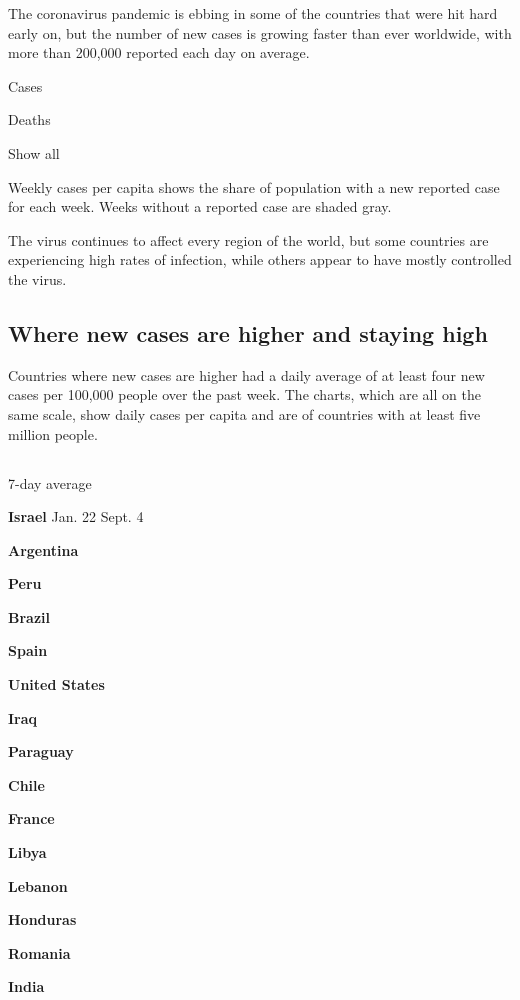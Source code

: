 The coronavirus pandemic is ebbing in some of the countries that were
hit hard early on, but the number of new cases is growing faster than
ever worldwide, with more than 200,000 reported each day on average.

Cases

Deaths

Show all

Weekly cases per capita shows the share of population with a new
reported case for each week. Weeks without a reported case are shaded
gray.

The virus continues to affect every region of the world, but some
countries are experiencing high rates of infection, while others appear
to have mostly controlled the virus.

\hypertarget{where-new-cases-are-higher-and-staying-high}{%
\subsection{Where new cases are higher and staying
high}\label{where-new-cases-are-higher-and-staying-high}}

Countries where new cases are higher had a daily average of at least
four new cases per 100,000 people over the past week. The charts, which
are all on the same scale, show daily cases per capita and are of
countries with at least five million people.

\subsection{}

7-day average

\textbf{Israel} Jan. 22 Sept. 4

\textbf{Argentina}

\textbf{Peru}

\textbf{Brazil}

\textbf{Spain}

\textbf{United States}

\textbf{Iraq}

\textbf{Paraguay}

\textbf{Chile}

\textbf{France}

\textbf{Libya}

\textbf{Lebanon}

\textbf{Honduras}

\textbf{Romania}

\textbf{India}

